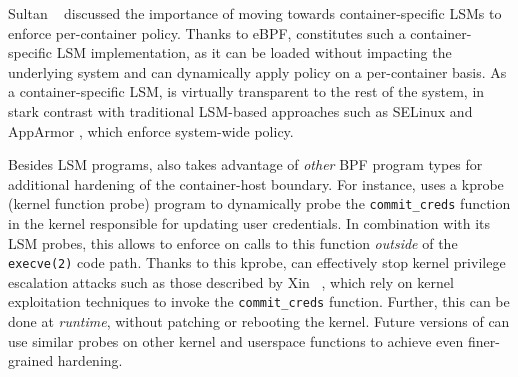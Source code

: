 Sultan \etal~\cite{sultan2019_container_security} discussed the importance of moving towards container-specific LSMs to enforce per-container policy. Thanks to eBPF, \bpfcontain{} constitutes such a container-specific LSM implementation, as it can be loaded without impacting the underlying system and can dynamically apply policy on a per-container basis. As a container-specific LSM, \bpfcontain{} is virtually transparent to the rest of the system, in stark contrast with traditional LSM-based approaches such as SELinux \cite{smalley2001_selinux} and AppArmor \cite{cowan2000_apparmor}, which enforce system-wide policy.

Besides LSM programs, \bpfcontain{} also takes advantage of \textit{other} BPF program types for additional hardening of the container-host boundary. For instance, \bpfcontain{} uses a kprobe (kernel function probe) program to dynamically probe the \texttt{commit\_creds} function in the kernel responsible for updating user credentials. In combination with its LSM probes, this allows \bpfcontain{} to enforce on calls to this function \textit{outside} of the \texttt{execve(2)} code path. Thanks to this kprobe, \bpfcontain{} can effectively stop kernel privilege escalation attacks such as those described by Xin \etal~\cite{xin2018_container_security}, which rely on kernel exploitation techniques to invoke the \texttt{commit\_creds} function. Further, this can be done at \textit{runtime}, without patching or rebooting the kernel. Future versions of \bpfcontain{} can use similar probes on other kernel and userspace functions to achieve even finer-grained hardening.
